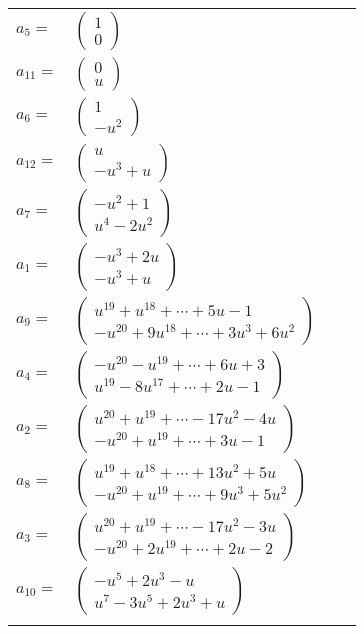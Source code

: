 \documentclass[1p]{elsarticle_modified}
\theoremstyle{definition}
\begin{document}
\begin{tabular}{m{7pt} m{180pt} m{7pt} m{180pt} }
\flushright $a_{5}=$&$\begin{pmatrix}1\\0\end{pmatrix}$ \\
\flushright $a_{11}=$&$\begin{pmatrix}0\\u\end{pmatrix}$ \\
\flushright $a_{6}=$&$\begin{pmatrix}1\\- u^2\end{pmatrix}$ \\
\flushright $a_{12}=$&$\begin{pmatrix}u\\- u^3+u\end{pmatrix}$ \\
\flushright $a_{7}=$&$\begin{pmatrix}- u^2+1\\u^4-2 u^2\end{pmatrix}$ \\
\flushright $a_{1}=$&$\begin{pmatrix}- u^3+2 u\\- u^3+u\end{pmatrix}$ \\
\flushright $a_{9}=$&$\begin{pmatrix}u^{19}+u^{18}+\cdots+5 u-1\\- u^{20}+9 u^{18}+\cdots+3 u^3+6 u^2\end{pmatrix}$ \\
\flushright $a_{4}=$&$\begin{pmatrix}- u^{20}- u^{19}+\cdots+6 u+3\\u^{19}-8 u^{17}+\cdots+2 u-1\end{pmatrix}$ \\
\flushright $a_{2}=$&$\begin{pmatrix}u^{20}+u^{19}+\cdots-17 u^2-4 u\\- u^{20}+u^{19}+\cdots+3 u-1\end{pmatrix}$ \\
\flushright $a_{8}=$&$\begin{pmatrix}u^{19}+u^{18}+\cdots+13 u^2+5 u\\- u^{20}+u^{19}+\cdots+9 u^3+5 u^2\end{pmatrix}$ \\
\flushright $a_{3}=$&$\begin{pmatrix}u^{20}+u^{19}+\cdots-17 u^2-3 u\\- u^{20}+2 u^{19}+\cdots+2 u-2\end{pmatrix}$ \\
\flushright $a_{10}=$&$\begin{pmatrix}- u^5+2 u^3- u\\u^7-3 u^5+2 u^3+u\end{pmatrix}$\\&\end{tabular}
\end{document}
